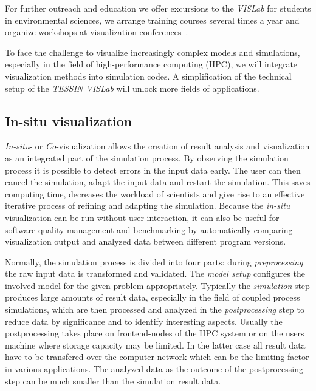 \documentclass[twocolumn]{svjour3}          %
\begin{document}
For further outreach and education we offer excursions to the \emph{VISLab} for students in environmental sciences, we arrange training courses several times a year and organize workshops at visualization conferences~\cite{web:envirvis}.

To face the challenge to visualize increasingly complex models and simulations, especially in the field of high-performance computing (HPC), we will integrate visualization methods into simulation codes. A simplification of the technical setup of the \emph{TESSIN VISLab} will unlock more fields of applications.

\subsection{In-situ visualization}
\label{in-situ-visualization}

\emph{In-situ}- or \emph{Co}-visualization allows the creation of result analysis and visualization as an integrated part of the simulation process. By observing the simulation process it is possible to detect errors in the input data early. The user can then cancel the simulation, adapt the input data and restart the simulation. This saves computing time, decreases the workload of scientists and give rise to an effective iterative process of refining and adapting the simulation. Because the \emph{in-situ} visualization can be run without user interaction, it can also be useful for software quality management and benchmarking by automatically comparing visualization output and analyzed data between different program versions.

Normally, the simulation process is divided into four parts: during \emph{preprocessing} the raw input data is transformed and validated. The \emph{model setup} configures the involved model for the given problem appropriately. Typically the \emph{simulation} step produces large amounts of result data, especially in the field of coupled process simulations, which are then processed and analyzed in the \emph{postprocessing} step to reduce data by significance and to identify interesting aspects. Usually the postprocessing takes place on frontend-nodes of the HPC system or on the users machine where storage capacity may be limited. In the latter case all result data have to be transfered over the computer network which can be the limiting factor in various applications. The analyzed data as the outcome of the postprocessing step can be much smaller than the simulation result data.
\end{document}
